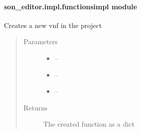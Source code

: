 \documentclass[letterpaper,10pt,english]{sphinxmanual}
\begin{document}
\paragraph{son\_editor.impl.functionsimpl module}
\label{_source/son_editor.impl:son-editor-impl-functionsimpl-module}\label{_source/son_editor.impl:module-son_editor.impl.functionsimpl}

\begin{fulllineitems}
\label{_source/son_editor.impl:son_editor.impl.functionsimpl.create_function}
Creates a new vnf in the project
\begin{quote}\begin{description}
\item[{Parameters}] \leavevmode\begin{itemize}
\item {} 
 -- 

\item {} 
 -- 

\item {} 
 -- 

\end{itemize}

\item[{Returns}] \leavevmode
The created function as a dict

\end{description}\end{quote}

\end{fulllineitems}

\end{document}
